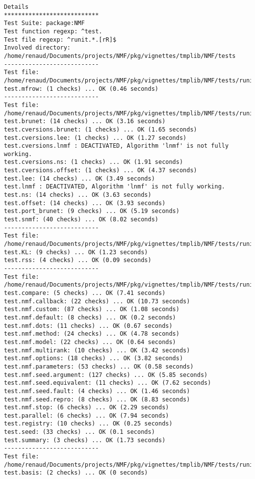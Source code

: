 \documentclass[10pt]{article}
\begin{document}
\begin{verbatim}
Details 
*************************** 
Test Suite: package:NMF 
Test function regexp: ^test. 
Test file regexp: ^runit.*.[rR]$ 
Involved directory: 
/home/renaud/Documents/projects/NMF/pkg/vignettes/tmplib/NMF/tests 
--------------------------- 
Test file: /home/renaud/Documents/projects/NMF/pkg/vignettes/tmplib/NMF/tests/runit.aheatmap.R 
test.mfrow: (1 checks) ... OK (0.46 seconds)
--------------------------- 
Test file: /home/renaud/Documents/projects/NMF/pkg/vignettes/tmplib/NMF/tests/runit.algorithms.r 
test.brunet: (14 checks) ... OK (3.16 seconds)
test.cversions.brunet: (1 checks) ... OK (1.65 seconds)
test.cversions.lee: (1 checks) ... OK (1.27 seconds)
test.cversions.lnmf : DEACTIVATED, Algorithm 'lnmf' is not fully working.
test.cversions.ns: (1 checks) ... OK (1.91 seconds)
test.cversions.offset: (1 checks) ... OK (4.37 seconds)
test.lee: (14 checks) ... OK (3.49 seconds)
test.lnmf : DEACTIVATED, Algorithm 'lnmf' is not fully working.
test.ns: (14 checks) ... OK (3.63 seconds)
test.offset: (14 checks) ... OK (3.93 seconds)
test.port_brunet: (9 checks) ... OK (5.19 seconds)
test.snmf: (40 checks) ... OK (8.02 seconds)
--------------------------- 
Test file: /home/renaud/Documents/projects/NMF/pkg/vignettes/tmplib/NMF/tests/runit.distance.r 
test.KL: (9 checks) ... OK (1.23 seconds)
test.rss: (4 checks) ... OK (0.09 seconds)
--------------------------- 
Test file: /home/renaud/Documents/projects/NMF/pkg/vignettes/tmplib/NMF/tests/runit.interface.r 
test.compare: (5 checks) ... OK (7.41 seconds)
test.nmf.callback: (22 checks) ... OK (10.73 seconds)
test.nmf.custom: (87 checks) ... OK (1.08 seconds)
test.nmf.default: (8 checks) ... OK (0.2 seconds)
test.nmf.dots: (11 checks) ... OK (0.67 seconds)
test.nmf.method: (24 checks) ... OK (4.78 seconds)
test.nmf.model: (22 checks) ... OK (0.64 seconds)
test.nmf.multirank: (10 checks) ... OK (3.42 seconds)
test.nmf.options: (18 checks) ... OK (3.82 seconds)
test.nmf.parameters: (53 checks) ... OK (0.58 seconds)
test.nmf.seed.argument: (127 checks) ... OK (5.85 seconds)
test.nmf.seed.equivalent: (11 checks) ... OK (7.62 seconds)
test.nmf.seed.fault: (4 checks) ... OK (1.46 seconds)
test.nmf.seed.repro: (8 checks) ... OK (8.83 seconds)
test.nmf.stop: (6 checks) ... OK (2.29 seconds)
test.parallel: (6 checks) ... OK (7.94 seconds)
test.registry: (10 checks) ... OK (0.25 seconds)
test.seed: (33 checks) ... OK (0.1 seconds)
test.summary: (3 checks) ... OK (1.73 seconds)
--------------------------- 
Test file: /home/renaud/Documents/projects/NMF/pkg/vignettes/tmplib/NMF/tests/runit.NMFclass.r 
test.basis: (2 checks) ... OK (0 seconds)

\end{verbatim}
\end{document}
